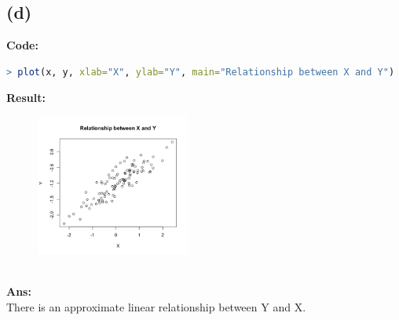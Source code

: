 \documentclass[twoside]{homework}
\begin{document}
\subsection*{(d)}
\textbf{Code:}
\begin{lstlisting}[language=R]
> plot(x, y, xlab="X", ylab="Y", main="Relationship between X and Y")
\end{lstlisting}
\textbf{Result:}
\begin{figure}[!h]
\begin{center}
\includegraphics[width=0.45\textwidth]{HW1_P3_d.png}
\end{center}
\label{fig:HW1_P3_d}
\end{figure}\\
\textbf{Ans:}\\
There is an approximate linear relationship between Y and X.
\end{document}
